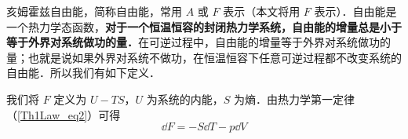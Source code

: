 

亥姆霍兹自由能，简称自由能，常用 $A$ 或 $F$ 表示（本文将用 $F$ 表示）．自由能是一个热力学态函数，\textbf{对于一个恒温恒容的封闭热力学系统，自由能的增量总是小于等于外界对系统做功的量．}在可逆过程中，自由能的增量等于外界对系统做功的量；也就是说如果外界对系统不做功，在恒温恒容下任意可逆过程都不改变系统的自由能．所以我们有如下定义．

我们将 $F$ 定义为 $U-TS$，$U$ 为系统的内能，$S$ 为熵．由热力学第一定律（\autoref{Th1Law_eq2}）可得
\begin{equation}
\dd F=-S\dd T-p\dd V
\end{equation}